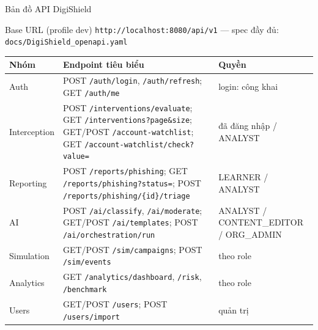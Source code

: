 \documentclass[aspectratio=169,12pt]{beamer}
\begin{document}
\begin{frame}[shrink=8]{Bản đồ API DigiShield}
  \begin{block}{Base URL (profile dev)}
    \texttt{http://localhost:8080/api/v1} --- spec đầy đủ:
    \texttt{docs/DigiShield\_openapi.yaml}
  \end{block}

  \begin{center}
  \scriptsize
  \setlength{\tabcolsep}{3pt}
  \renewcommand{\arraystretch}{1.02}
  \begin{tabular}{>{\raggedright\arraybackslash}p{1.9cm}>{\raggedright\arraybackslash}p{6.4cm}>{\raggedright\arraybackslash}p{3.4cm}}
    \toprule
    \textbf{Nhóm} & \textbf{Endpoint tiêu biểu} & \textbf{Quyền} \\
    \midrule
    Auth & POST \texttt{/auth/login}, \texttt{/auth/refresh}; GET \texttt{/auth/me} & login: công khai \\
    Interception & POST \texttt{/interventions/evaluate}; GET \texttt{/interventions?page\&size}; GET/POST \texttt{/account-watchlist}; GET \texttt{/account-watchlist/check?value=} & đã đăng nhập / ANALYST \\
    Reporting & POST \texttt{/reports/phishing}; GET \texttt{/reports/phishing?status=}; POST \texttt{/reports/phishing/\{id\}/triage} & LEARNER / ANALYST \\
    AI & POST \texttt{/ai/classify}, \texttt{/ai/moderate}; GET/POST \texttt{/ai/templates}; POST \texttt{/ai/orchestration/run} & ANALYST / CONTENT\_EDITOR / ORG\_ADMIN \\
    Simulation & GET/POST \texttt{/sim/campaigns}; POST \texttt{/sim/events} & theo role \\
    Analytics & GET \texttt{/analytics/dashboard}, \texttt{/risk}, \texttt{/benchmark} & theo role \\
    Users & GET/POST \texttt{/users}; POST \texttt{/users/import} & quản trị \\
    \bottomrule
  \end{tabular}
  \renewcommand{\arraystretch}{1}
  \end{center}
\end{frame}
\end{document}
